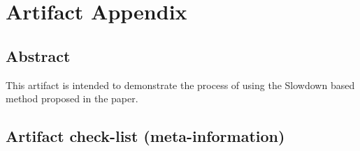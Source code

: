 \documentclass{sigplanconf}
\begin{document}
	
	
	
	\appendix
	\section{Artifact Appendix}
	
	\subsection{Abstract}
	
	This artifact is intended to demonstrate the process of using the Slowdown based
	method proposed in the paper.
	
	\subsection{Artifact check-list (meta-information)}
	
\end{document}
